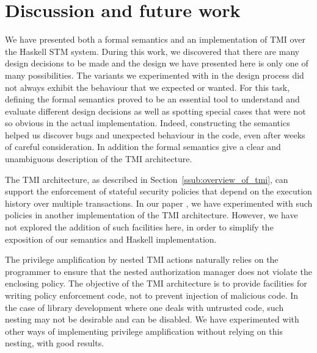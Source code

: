 \section{Discussion and future work}
\label{sec:conclusion}

We have presented both a formal semantics and an implementation of TMI over the
Haskell STM system. During this work, we discovered that there are many design
decisions to be made and the design we have presented here is only one of many
possibilities. The variants we experimented with in the design process did not
always exhibit the behaviour that we expected or wanted. For this task, defining
the formal semantics proved to be an essential tool to understand and evaluate
different design decisions as well as spotting special cases that were not so
obvious in the actual implementation. 
Indeed, constructing the semantics helped us discover bugs
and unexpected behaviour in the code, even after weeks of careful consideration.
In addition the formal semantics give a clear and unambiguous
description of the TMI architecture.

%
%
%

The TMI architecture, as described in Section~\ref{ssub:overview_of_tmi}, 
can support the enforcement of stateful security policies that depend on the 
execution history over multiple transactions.  In our paper \cite{tmi}, we have experimented 
with such policies in another implementation of the TMI architecture.  
However, we have not explored the addition of such facilities here, 
in order to simplify the exposition of our semantics and Haskell implementation.

The privilege amplification by nested TMI actions naturally relies on the programmer
to ensure that the nested authorization manager does not violate the enclosing
policy. The objective of the TMI architecture is to provide facilities for writing
policy enforcement code, not to prevent injection of malicious code. In the case of library
development where one deals with untrusted code, such nesting may not be desirable and can
be disabled. We have experimented with other ways of implementing privilege amplification
without relying on this nesting, with good results.

